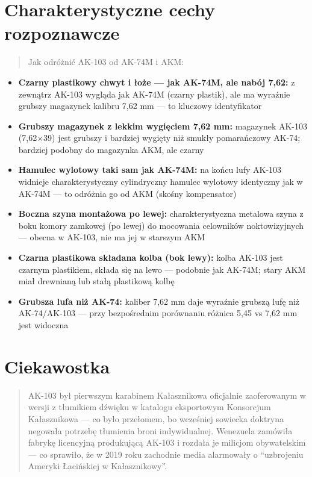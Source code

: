 \documentclass[12pt,openany,oneside]{book}
\providecommand{\tightlist}{%
  \setlength{\itemsep}{0pt}\setlength{\parskip}{0pt}}
\begin{document}
\section{Charakterystyczne cechy
rozpoznawcze}\label{charakterystyczne-cechy-rozpoznawcze-48}

\begin{quote}
Jak odróżnić AK-103 od AK-74M i AKM:
\end{quote}

\begin{itemize}
\tightlist
\item
  \textbf{Czarny plastikowy chwyt i łoże --- jak AK-74M, ale nabój
  7,62:} z zewnątrz AK-103 wygląda jak AK-74M (czarny plastik), ale ma
  wyraźnie grubszy magazynek kalibru 7,62 mm --- to kluczowy
  identyfikator
\item
  \textbf{Grubszy magazynek z lekkim wygięciem 7,62 mm:} magazynek
  AK-103 (7,62×39) jest grubszy i bardziej wygięty niż smukły
  pomarańczowy AK-74; bardziej podobny do magazynka AKM, ale czarny
\item
  \textbf{Hamulec wylotowy taki sam jak AK-74M:} na końcu lufy AK-103
  widnieje charakterystyczny cylindryczny hamulec wylotowy identyczny
  jak w AK-74M --- to odróżnia go od AKM (skośny kompensator)
\item
  \textbf{Boczna szyna montażowa po lewej:} charakterystyczna metalowa
  szyna z boku komory zamkowej (po lewej) do mocowania celowników
  noktowizyjnych --- obecna w AK-103, nie ma jej w starszym AKM
\item
  \textbf{Czarna plastikowa składana kolba (bok lewy):} kolba AK-103
  jest czarnym plastikiem, składa się na lewo --- podobnie jak AK-74M;
  stary AKM miał drewnianą lub stałą plastikową kolbę
\item
  \textbf{Grubsza lufa niż AK-74:} kaliber 7,62 mm daje wyraźnie grubszą
  lufę niż AK-74/AK-103 --- przy bezpośrednim porównaniu różnica 5,45 vs
  7,62 mm jest widoczna
\end{itemize}

\section{Ciekawostka}\label{ciekawostka-48}

\begin{quote}
AK-103 był pierwszym karabinem Kałasznikowa oficjalnie zaoferowanym w
wersji z tłumikiem dźwięku w katalogu eksportowym Konsorcjum
Kałasznikowa --- co było przełomem, bo wcześniej sowiecka doktryna
negowała potrzebę tłumienia broni indywidualnej. Wenezuela zamówiła
fabrykę licencyjną produkującą AK-103 i rozdała je milicjom obywatelskim
--- co sprawiło, że w 2019 roku zachodnie media alarmowały o
``uzbrojeniu Ameryki Łacińskiej w Kałasznikowy''.
\end{quote}
\end{document}
